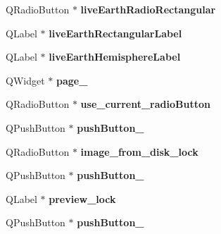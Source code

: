 \begin{DoxyCompactItemize}
\item 
\hypertarget{classUi__Extras_a82b9691ce85e1f9a0acc5b7b3ecb93d9}{
QRadioButton $\ast$ {\bfseries liveEarthRadioRectangular}}
\label{classUi__Extras_a82b9691ce85e1f9a0acc5b7b3ecb93d9}

\item 
\hypertarget{classUi__Extras_a47b81ab7a2a08615128f151dd5598384}{
QLabel $\ast$ {\bfseries liveEarthRectangularLabel}}
\label{classUi__Extras_a47b81ab7a2a08615128f151dd5598384}

\item 
\hypertarget{classUi__Extras_a32d0c47f2bdb36fa0dce8dc81bc51223}{
QLabel $\ast$ {\bfseries liveEarthHemisphereLabel}}
\label{classUi__Extras_a32d0c47f2bdb36fa0dce8dc81bc51223}

\item 
\hypertarget{classUi__Extras_a328f350266fb266b688ca9e27b47ccfe}{
QWidget $\ast$ {\bfseries page\_}}
\label{classUi__Extras_a328f350266fb266b688ca9e27b47ccfe}

\item 
\hypertarget{classUi__Extras_ad156478b17efed331b8d0663c871816a}{
QRadioButton $\ast$ {\bfseries use\_\-current\_\-radioButton}}
\label{classUi__Extras_ad156478b17efed331b8d0663c871816a}

\item 
\hypertarget{classUi__Extras_aa1564e61ad2e27f314d022fed8d86383}{
QPushButton $\ast$ {\bfseries pushButton\_}}
\label{classUi__Extras_aa1564e61ad2e27f314d022fed8d86383}

\item 
\hypertarget{classUi__Extras_a4727a96c8081f654bc01d2094a19fd45}{
QRadioButton $\ast$ {\bfseries image\_\-from\_\-disk\_\-lock}}
\label{classUi__Extras_a4727a96c8081f654bc01d2094a19fd45}

\item 
\hypertarget{classUi__Extras_a6203cc72861a2bf0165a5190c11c2698}{
QPushButton $\ast$ {\bfseries pushButton\_}}
\label{classUi__Extras_a6203cc72861a2bf0165a5190c11c2698}

\item 
\hypertarget{classUi__Extras_ac4781c1e6ae1e2480713db1da125fe03}{
QLabel $\ast$ {\bfseries preview\_\-lock}}
\label{classUi__Extras_ac4781c1e6ae1e2480713db1da125fe03}

\item 
\hypertarget{classUi__Extras_aa0bad61fb43a9419d5e023e3abfd5def}{
QPushButton $\ast$ {\bfseries pushButton\_}}
\label{classUi__Extras_aa0bad61fb43a9419d5e023e3abfd5def}


\end{DoxyCompactItemize}
